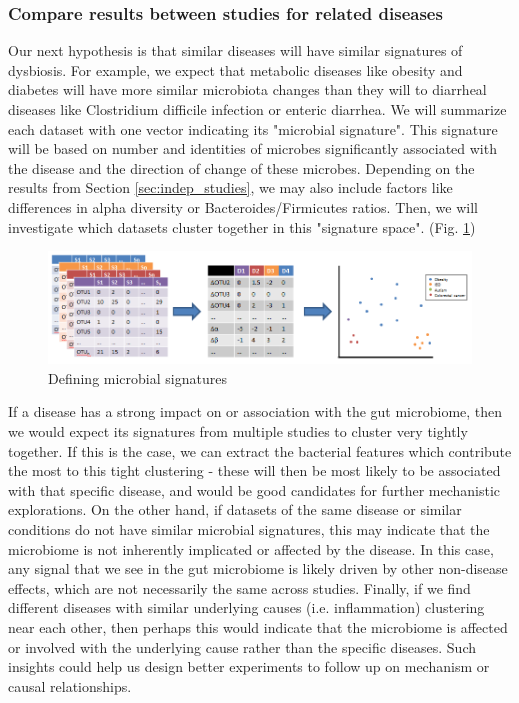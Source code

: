 \documentclass[12pt]{article}
\begin{document}
\subsubsection{Compare results between studies for related diseases}\label{sec:signatures}
Our next hypothesis is that similar diseases will have similar signatures of dysbiosis. For example, we expect that metabolic diseases like obesity and diabetes will have more similar microbiota changes than they will to diarrheal diseases like Clostridium difficile infection or enteric diarrhea. We will summarize each dataset with one vector indicating its "microbial signature". This signature will be based on number and identities of microbes significantly associated with the disease and the direction of change of these microbes. Depending on the results from Section \ref{sec:indep_studies}, we may also include factors like differences in alpha diversity or Bacteroides/Firmicutes ratios. Then, we will investigate which datasets cluster together in this "signature space". (Fig. \ref{fig:microbe_signatures})

\begin{figure}
\begin{center}
\includegraphics[scale=0.5]{microbial_signatures}
\caption{Defining microbial signatures}\label{fig:microbe_signatures}
\end{center}
\end{figure}


If a disease has a strong impact on or association with the gut microbiome, then we would expect its signatures from multiple studies to cluster very tightly together. If this is the case, we can extract the bacterial features which contribute the most to this tight clustering - these will then be most likely to be associated with that specific disease, and would be good candidates for further mechanistic explorations. On the other hand, if datasets of the same disease or similar conditions do not have similar microbial signatures, this may indicate that the microbiome is not inherently implicated or affected by the disease. In this case, any signal that we see in the gut microbiome is likely driven by other non-disease effects, which are not necessarily the same across studies. Finally, if we find different diseases with similar underlying causes (i.e. inflammation) clustering near each other, then perhaps this would indicate that the microbiome is affected or involved with the underlying cause rather than the specific diseases. Such insights could help us design better experiments to follow up on mechanism or causal relationships.
\end{document}
